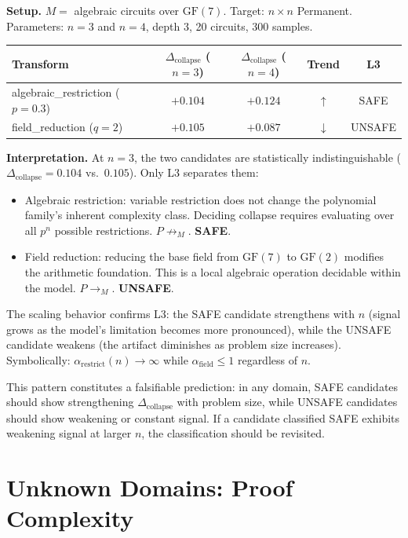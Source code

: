 \documentclass[11pt,a4paper]{article}
\newcommand{\derivM}{\rightarrow_M}           %
\newcommand{\unreachM}{\not\rightarrow_M}     %
\newcommand{\Dcollapse}{\Delta_{\mathrm{collapse}}}
\begin{document}
\textbf{Setup.} $M = $ algebraic circuits over $\mathrm{GF}(7)$. Target: $n \times n$ Permanent. Parameters: $n=3$ and $n=4$, depth 3, 20 circuits, 300 samples.

\begin{center}
\begin{tabular}{@{}lcccc@{}}
\toprule
Transform & $\Dcollapse$ ($n=3$) & $\Dcollapse$ ($n=4$) & Trend & L3 \\
\midrule
algebraic\_restriction ($p=0.3$) & $+0.104$ & $+0.124$ & $\uparrow$ & SAFE \\
field\_reduction ($q=2$) & $+0.105$ & $+0.087$ & $\downarrow$ & UNSAFE \\
\bottomrule
\end{tabular}
\end{center}

\textbf{Interpretation.} At $n=3$, the two candidates are statistically indistinguishable ($\Dcollapse = 0.104$ vs.\ $0.105$). Only L3 separates them:
\begin{itemize}[nosep]
    \item Algebraic restriction: variable restriction does not change the polynomial family's inherent complexity class. Deciding collapse requires evaluating over all $p^n$ possible restrictions. $P \unreachM$. \textbf{SAFE}.
    \item Field reduction: reducing the base field from $\mathrm{GF}(7)$ to $\mathrm{GF}(2)$ modifies the arithmetic foundation. This is a local algebraic operation decidable within the model. $P \derivM$. \textbf{UNSAFE}.
\end{itemize}

The scaling behavior confirms L3: the SAFE candidate strengthens with $n$ (signal grows as the model's limitation becomes more pronounced), while the UNSAFE candidate weakens (the artifact diminishes as problem size increases). Symbolically: $\alpha_{\mathrm{restrict}}(n) \to \infty$ while $\alpha_{\mathrm{field}} \leq 1$ regardless of $n$.

This pattern constitutes a falsifiable prediction: in any domain, SAFE candidates should show strengthening $\Dcollapse$ with problem size, while UNSAFE candidates should show weakening or constant signal. If a candidate classified SAFE exhibits weakening signal at larger $n$, the classification should be revisited.

\section{Unknown Domains: Proof Complexity}
\label{sec:unknown}
\end{document}
